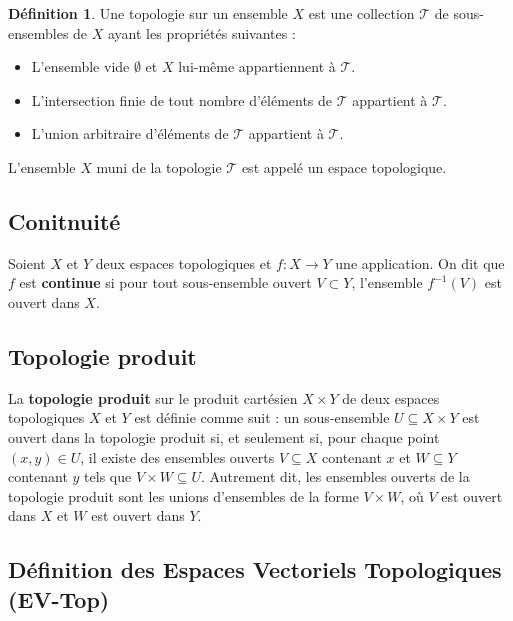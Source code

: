 \documentclass{article}
\theoremstyle{definition}
\newtheorem{definition}{Définition}[section]
\theoremstyle{plain}
\begin{document}
\begin{definition}
    Une topologie sur un ensemble $X$ est une collection $\mathcal{T}$ de sous-ensembles de $X$ ayant les propriétés suivantes :

    \begin{itemize}
        \item L'ensemble vide $\emptyset$ et $X$ lui-même appartiennent à $\mathcal{T}$.
        \item L'intersection finie de tout nombre d'éléments de $\mathcal{T}$ appartient à $\mathcal{T}$.
        \item L'union arbitraire d'éléments de $\mathcal{T}$ appartient à $\mathcal{T}$.
    \end{itemize}

    L'ensemble $X$ muni de la topologie $\mathcal{T}$ est appelé un espace topologique.

\end{definition}

\subsection{Conitnuité}
Soient \(X\) et \(Y\) deux espaces topologiques et \(f : X \to Y\) une application. On dit que \(f\) est \textbf{continue} si pour tout sous-ensemble ouvert \(V \subset Y\), l'ensemble \(f^{-1}(V)\) est ouvert dans \(X\).

\subsection{Topologie produit}
La \textbf{topologie produit} sur le produit cartésien $X \times Y$ de deux espaces topologiques $X$ et $Y$ est définie comme suit : un sous-ensemble $U \subseteq X \times Y$ est ouvert dans la topologie produit si, et seulement si, pour chaque point $(x, y) \in U$, il existe des ensembles ouverts $V \subseteq X$ contenant $x$ et $W \subseteq Y$ contenant $y$ tels que $V \times W \subseteq U$. Autrement dit, les ensembles ouverts de la topologie produit sont les unions d'ensembles de la forme $V \times W$, où $V$ est ouvert dans $X$ et $W$ est ouvert dans $Y$.


\subsection{Définition des Espaces Vectoriels Topologiques (EV-Top)}
\end{document}
